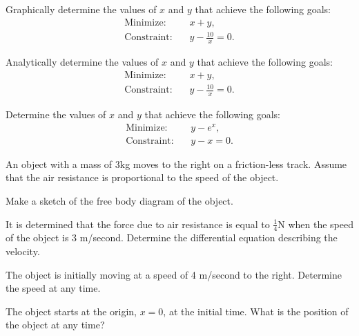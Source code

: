 
\begin{problem}
\item Graphically determine the values of $x$ and $y$ that achieve the
  following goals:
  \begin{eqnarray*}
    \mathrm{Minimize:}  & & x+y, \\
    \mathrm{Constraint:}  & & y - \frac{10}{x}  =  0.
  \end{eqnarray*}
  \vfill

\item Analytically determine the values of $x$ and $y$ that achieve the
  following goals:
  \begin{eqnarray*}
    \mathrm{Minimize:} && x+y, \\
    \mathrm{Constraint:} && y - \frac{10}{x}  =  0.
  \end{eqnarray*}
  \vfill

\end{problem}


\begin{problem}
\item Determine the values of $x$ and $y$ that achieve the following
  goals: 
  \begin{eqnarray*}
    \mathrm{Minimize:} & & y - e^x, \\
    \mathrm{Constraint:} & & y - x  =  0.
  \end{eqnarray*}

  \vfill

  \clearpage

\item An object with a mass of 3kg moves to the right on a
  friction-less track. Assume that the air resistance is proportional
  to the speed of the object.
  \begin{subproblem}
  \item Make a sketch of the free body diagram of the object.
    \vfill
  \item It is determined that the force due to air resistance is equal
    to $\frac{1}{4}$N when the speed of the object is 3
    m/second. Determine the differential equation describing the velocity.
    \vfill
  \item The object is initially moving at a speed of 4 m/second to the
    right. Determine the speed at any time.
    \vfill
  \item The object starts at the origin, $x=0$, at the initial
    time. What is the position of the object at any time?
  \end{subproblem}

\end{problem}


